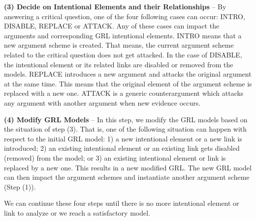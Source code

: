 \textbf{(3) Decide on Intentional Elements and their Relationships} -- By answering a critical question, one of the four following cases can occur: \textsf{INTRO}, \textsf{DISABLE}, \textsf{REPLACE} or \textsf{ATTACK}.  Any of these cases can  impact the arguments and corresponding GRL intentional elements.  \textsf{INTRO} means that 
a new argument scheme is created. That means, the current argument scheme related to the critical question does not get attacked.  In the case of \textsf{DISABLE}, the intentional element or its related links are disabled or removed from the models. \textsf{REPLACE} introduces a new argument and attacks the original argument at the same time. This means that the original element of the argument scheme is replaced with a new one. \textsf{ATTACK} is a generic counterargument which attacks any argument with another argument when new evidence occurs.  

\textbf{(4) Modify GRL Models} -- In this step, we modify the GRL models based on the situation of step (3). That is, one of the following situation can happen with respect to the initial GRL model: 1) a new intentional element or a new link is introduced; 2) an existing intentional element or an existing link gets disabled (removed) from the model; or 3) an existing intentional element or link is replaced by a new one. This results in a new modified GRL. The new GRL model can then impact the argument schemes and instantiate another argument scheme (Step (1)).   

We can continue these four steps until there is no more intentional element or link to analyze or we reach a satisfactory model. 